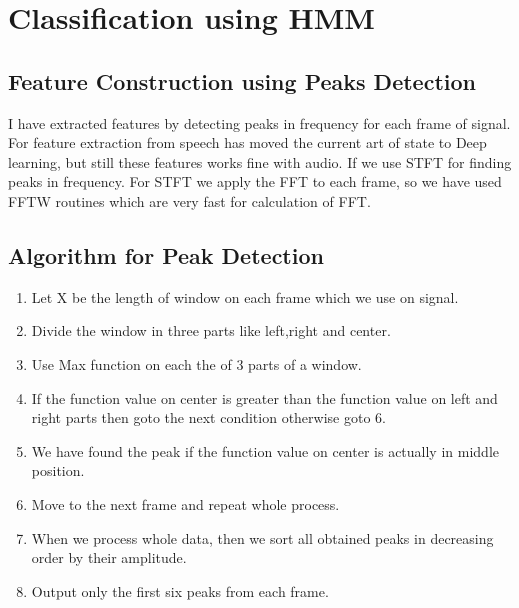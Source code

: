 \documentclass[11pt]{report}
\begin{document}
\section{Classification using HMM}
\subsection{Feature Construction using Peaks Detection}
I have extracted features by detecting peaks in frequency for each frame of signal. For feature extraction from speech has moved the current art of state to Deep learning, but still these features works fine with audio. If we use STFT for finding peaks in frequency. For STFT we apply the FFT to each frame, so we have used FFTW \cite{FFTW05} routines which are very fast for calculation of FFT.
\subsection{Algorithm for Peak Detection}
\begin{enumerate}
\item Let X be the length of window on each frame which we use on signal.
\item Divide the window in three parts like left,right and center.
\item Use Max function on each the of 3 parts of a window.
\item If the function value on center is greater than the  function value on left and right parts then goto the next condition otherwise goto 6.
\item We have found the peak if the function value on center is actually in middle position.
\item Move to the next frame and repeat whole process.
\item When we process whole data, then we sort all obtained peaks in decreasing order by their amplitude. 
\item Output only the first six peaks from each frame.
\end{enumerate}
\end{document}
